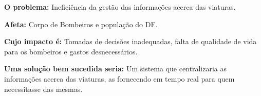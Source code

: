 
  \textbf{O problema:} Ineficiência da gestão das informações acerca das viaturas.
  
  \textbf{Afeta:} Corpo de Bombeiros e população do DF.
  
  \textbf{Cujo impacto é:} Tomadas de decisões inadequadas, falta de qualidade de vida para os bombeiros e gastos desnecessários.
  
  \textbf{Uma solução bem sucedida seria:} Um sistema que centralizaria as informações acerca das viaturas, as fornecendo 
  em tempo real para quem necessitasse das mesmas.